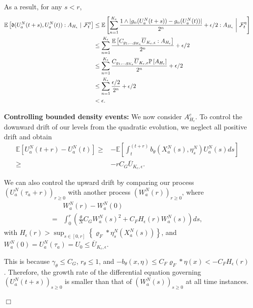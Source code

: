 \documentclass[12pt]{article}
\newenvironment {proof}{{\noindent\bf Proof }}{\hfill $\Box$ \medskip}
\begin{document}
\begin{proof}
As a result, for any $s < r$,
\begin{equation}
\begin{aligned}
\mathbb{E}\left[\mathfrak{d}(U^{N}_{a}(t+s),U^{N}_{a}(t)) : A_{H_{\epsilon}} ~|~{\cal F}_t^{
\eta} \right] & \leq  
  \mathbb{E}\left[\sum_{n=1}^{K_{\epsilon}}\frac{1 \wedge |g_n(U^{N}_{a}(t+s))-g_n(U^{N}_{a}(t))|}{2^n} +  \epsilon/2: A_{H_{\epsilon}} ~\bigg|~{\cal F}_t^{
\eta} \right]  \\
 & \leq  \sum_{n=1}^{K_{\epsilon}}\frac{\mathbb{E}\left[C_{g_1,..,g_{K_{\epsilon}}} \overline{U}_{K_{\epsilon}, \epsilon}: A_{H_{\epsilon}} \right] }{2^n} +  \epsilon/2  \\
& \leq  \sum_{n=1}^{K_{\epsilon}}\frac{C_{g_1,..,g_{K_{\epsilon}}} \overline{U}_{K_{\epsilon}, \epsilon}\mathbb{P}\left[ A_{H_{\epsilon}} \right] }{2^n} +  \epsilon/2 \\
& \leq  \sum_{n=1}^{K_{\epsilon}}\frac{\epsilon /2 }{2^n} +  \epsilon/2 \\
& < \epsilon.
\end{aligned}
\end{equation}

\textbf{Controlling bounded density events:}
We now consider $A_{H_{\epsilon}}^{c}$.
To control the downward drift of our levels from the quadratic evolution,
we neglect all positive drift and obtain
\begin{equation}
\begin{aligned}
\mathbb{E}[U^{N}_{a}(t+r)-U^{N}_{a}(t)] \geq   &   - \mathbb{E}\left[\int_{t}^{(t+r)  } b_{\theta}(X^N_a(s),\eta^N_s) U^N_a(s)ds\right]\\
\geq& - rC_G\overline{U}_{K_{\epsilon}, \epsilon}.
\end{aligned}    
\end{equation}

We can also control the upward drift by comparing our process $(U^N_{a}(\tau_a+r))_{r \geq 0}$ with another process $(W^N_a(r))_{r \geq 0}$, where 
\begin{align*}
&W^{N}_{a}(r)-W^{N}_{a}(0)\\
=&\int_{0}^{r}
\left(
        \frac{\theta}{N} C_G W^N_a(s)^2
        +
        C_F H_{\epsilon}(r) W^N_a(s)
    \right)
    ds,
\end{align*}
with $H_{\epsilon}(r) > \sup_{s\in [0,r]}\left\{\varrho_F*\eta^N_s(X^N_a(s)) \right\}$,
and $W^N_a(0)=U^N_a(\tau_a) = U_0 \leq \overline{U}_{K_{\epsilon}, \epsilon}$.

This is because $\gamma_{\theta} \leq C_G$, $r_{\theta} \leq 1$, and $-b_{\theta}(x, \eta) \leq  C_F \varrho_F * \eta(x) < -C_F H_{\epsilon}(r)$. Therefore, the growth rate of the differential equation governing $(U^N_a(t+s))_{s \geq 0}$ is smaller than that of $(W^N_a(s))_{s \geq 0}$ at all time instances.


\end{proof}
\end{document}
